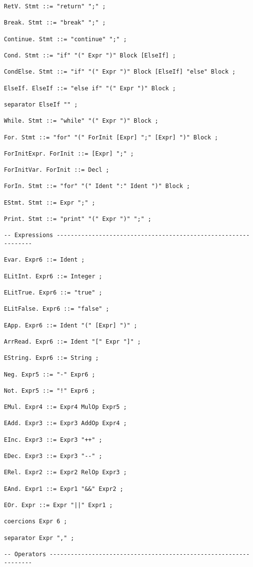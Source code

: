 \documentclass[a4paper]{article}
\begin{document}
\begin{lstlisting}
RetV. Stmt ::= "return" ";" ;

Break. Stmt ::= "break" ";" ;

Continue. Stmt ::= "continue" ";" ;

Cond. Stmt ::= "if" "(" Expr ")" Block [ElseIf] ;

CondElse. Stmt ::= "if" "(" Expr ")" Block [ElseIf] "else" Block ;

ElseIf. ElseIf ::= "else if" "(" Expr ")" Block ;

separator ElseIf "" ;

While. Stmt ::= "while" "(" Expr ")" Block ;

For. Stmt ::= "for" "(" ForInit [Expr] ";" [Expr] ")" Block ;

ForInitExpr. ForInit ::= [Expr] ";" ;

ForInitVar. ForInit ::= Decl ;

ForIn. Stmt ::= "for" "(" Ident ":" Ident ")" Block ; 

EStmt. Stmt ::= Expr ";" ;

Print. Stmt ::= "print" "(" Expr ")" ";" ;

-- Expressions ---------------------------------------------------------------

Evar. Expr6 ::= Ident ;

ELitInt. Expr6 ::= Integer ;

ELitTrue. Expr6 ::= "true" ;

ELitFalse. Expr6 ::= "false" ;

EApp. Expr6 ::= Ident "(" [Expr] ")" ;

ArrRead. Expr6 ::= Ident "[" Expr "]" ;

EString. Expr6 ::= String ;

Neg. Expr5 ::= "-" Expr6 ;

Not. Expr5 ::= "!" Expr6 ;

EMul. Expr4 ::= Expr4 MulOp Expr5 ;

EAdd. Expr3 ::= Expr3 AddOp Expr4 ;

EInc. Expr3 ::= Expr3 "++" ;

EDec. Expr3 ::= Expr3 "--" ;

ERel. Expr2 ::= Expr2 RelOp Expr3 ;

EAnd. Expr1 ::= Expr1 "&&" Expr2 ;

EOr. Expr ::= Expr "||" Expr1 ;

coercions Expr 6 ;

separator Expr "," ;

-- Operators -----------------------------------------------------------------


\end{lstlisting}
\end{document}
